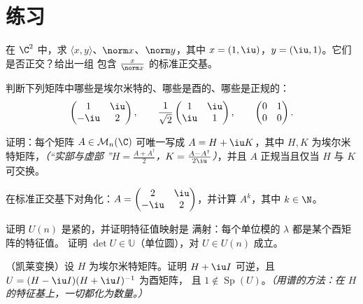 \section{练习}

\begin{exercise}[$\star$]\label{exo:b2:hermitian:1}
在 $\C^2$ 中，求 $\langle x, y\rangle$、$\norm x$、$\norm y$，其中
$x = (1, \iu)$，$y = (\iu, 1)$。它们是否正交？给出一组
包含 $\frac{x}{\norm x}$ 的标准正交基。
\end{exercise}

\begin{exercise}[$\star$]\label{exo:b2:hermitian:2}
判断下列矩阵中哪些是埃尔米特的、哪些是酉的、哪些是正规的：
\[
\begin{pmatrix} 1 & \iu\\ -\iu & 2 \end{pmatrix},
\qquad
\frac{1}{\sqrt2}\begin{pmatrix} 1 & \iu\\ \iu & 1\end{pmatrix},
\qquad
\begin{pmatrix} 0 & 1\\ 0 & 0 \end{pmatrix}.
\]
\end{exercise}

\begin{exercise}[$\star$]\label{exo:b2:hermitian:3}
证明：每个矩阵 $A \in \mathcal{M}_n(\C)$ 可唯一写成 $A =
H + \iu K$，其中 $H, K$ 为埃尔米特矩阵，\emph{（“实部与虚部
”$H = \frac{A + A^\dagger}{2}$，$K = \frac{A -
A^\dagger}{2\iu}$）}，并且 $A$ 正规当且仅当 $H$ 与 $K$
可交换。
\end{exercise}

\begin{exercise}[$\star\star$]\label{exo:b2:hermitian:4}
在标准正交基下对角化：$A = \begin{pmatrix} 2 & \iu\\
-\iu & 2\end{pmatrix}$，并计算 $A^k$，其中 $k \in \N$。
\end{exercise}

\begin{exercise}[$\star\star$]\label{exo:b2:hermitian:5}
证明 $U(n)$ 是紧的，并证明特征值映射是
满射：每个单位模的 $\lambda$ 都是某个酉矩阵的特征值。
证明 $\det U \in \mathbb{U}$（单位圆），对 $U \in
U(n)$ 成立。
\end{exercise}

\begin{exercise}[$\star\star$]\label{exo:b2:hermitian:6}
（凯莱变换）设 $H$ 为埃尔米特矩阵。证明 $H + \iu I$
可逆，且 $U = (H - \iu I)(H + \iu I)^{-1}$ 为酉矩阵，
且 $1 \notin \operatorname{Sp}(U)$。\emph{（用谱的方法：在
$H$ 的特征基上，一切都化为数量。）}
\end{exercise}

